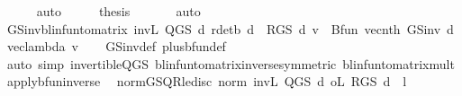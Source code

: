 \begin{isabellebody}
\ \ \ \ \isamarkupfalse%
\ auto\isanewline
\ \ \isamarkupfalse%
\ \isamarkupfalse%
\ {\isacharquery}{\kern0pt}thesis\ \isanewline
\ \ \ \ \isamarkupfalse%
\ auto\isanewline
{}\isamarkupfalse%
%
\endisatagproof
{\isafoldproof}%
%
\isadelimproof
\isanewline
%
\endisadelimproof
\isanewline
{}\isamarkupfalse%
\ GS{\isacharunderscore}{\kern0pt}inv{\isacharunderscore}{\kern0pt}blinfun{\isacharunderscore}{\kern0pt}to{\isacharunderscore}{\kern0pt}matrix{\isacharcolon}{\kern0pt}\ {\isachardoublequoteopen}{\isacharparenleft}{\kern0pt}{\isacharparenleft}{\kern0pt}inv\isactrlsub L\ {\isacharparenleft}{\kern0pt}Q{\isacharunderscore}{\kern0pt}GS\ d{\isacharparenright}{\kern0pt}{\isacharparenright}{\kern0pt}\ {\isacharparenleft}{\kern0pt}r{\isacharunderscore}{\kern0pt}det\isactrlsub b\ d\ {\isacharplus}{\kern0pt}\ R{\isacharunderscore}{\kern0pt}GS\ d\ v{\isacharparenright}{\kern0pt}{\isacharparenright}{\kern0pt}\ {\isacharequal}{\kern0pt}\ Bfun\ {\isacharparenleft}{\kern0pt}vec{\isacharunderscore}{\kern0pt}nth\ {\isacharparenleft}{\kern0pt}GS{\isacharunderscore}{\kern0pt}inv\ d\ {\isacharparenleft}{\kern0pt}vec{\isacharunderscore}{\kern0pt}lambda\ v{\isacharparenright}{\kern0pt}{\isacharparenright}{\kern0pt}{\isacharparenright}{\kern0pt}{\isachardoublequoteclose}\isanewline
%
\isadelimproof
\ \ %
\endisadelimproof
%
\isatagproof
{}\isamarkupfalse%
\ GS{\isacharunderscore}{\kern0pt}inv{\isacharunderscore}{\kern0pt}def\ plus{\isacharunderscore}{\kern0pt}bfun{\isacharunderscore}{\kern0pt}def\isanewline
\ \ \isamarkupfalse%
\ {\isacharparenleft}{\kern0pt}auto\ simp{\isacharcolon}{\kern0pt}\ invertible{\isacharunderscore}{\kern0pt}Q{\isacharunderscore}{\kern0pt}GS\ blinfun{\isacharunderscore}{\kern0pt}to{\isacharunderscore}{\kern0pt}matrix{\isacharunderscore}{\kern0pt}inverse{\isacharparenleft}{\kern0pt}{}{\isacharparenright}{\kern0pt}{\isacharbrackleft}{\kern0pt}symmetric{\isacharbrackright}{\kern0pt}\ blinfun{\isacharunderscore}{\kern0pt}to{\isacharunderscore}{\kern0pt}matrix{\isacharunderscore}{\kern0pt}mult{\isacharprime}{\kern0pt}{\isacharprime}{\kern0pt}\ apply{\isacharunderscore}{\kern0pt}bfun{\isacharunderscore}{\kern0pt}inverse\ {\isacharparenright}{\kern0pt}%
\endisatagproof
{\isafoldproof}%
%
\isadelimproof
\isanewline
%
\endisadelimproof
\isanewline
{}\isamarkupfalse%
\ norm{\isacharunderscore}{\kern0pt}GS{\isacharunderscore}{\kern0pt}QR{\isacharunderscore}{\kern0pt}le{\isacharunderscore}{\kern0pt}disc{\isacharcolon}{\kern0pt}\ {\isachardoublequoteopen}norm\ {\isacharparenleft}{\kern0pt}inv\isactrlsub L\ {\isacharparenleft}{\kern0pt}Q{\isacharunderscore}{\kern0pt}GS\ d{\isacharparenright}{\kern0pt}\ o\isactrlsub L\ R{\isacharunderscore}{\kern0pt}GS\ d{\isacharparenright}{\kern0pt}\ {\isasymle}\ l{\isachardoublequoteclose}\isanewline

\end{isabellebody}
